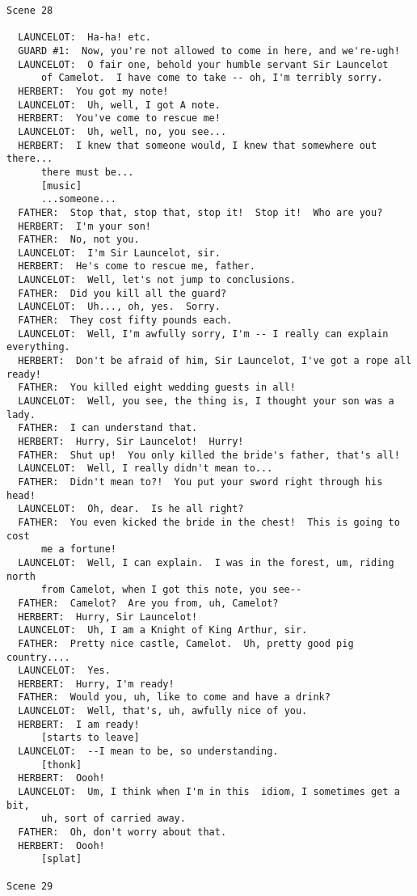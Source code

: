 \documentclass{article}
\begin{document}
\begin{verbatim}
Scene 28

  LAUNCELOT:  Ha-ha! etc.
  GUARD #1:  Now, you're not allowed to come in here, and we're-ugh!
  LAUNCELOT:  O fair one, behold your humble servant Sir Launcelot
      of Camelot.  I have come to take -- oh, I'm terribly sorry.
  HERBERT:  You got my note!
  LAUNCELOT:  Uh, well, I got A note.
  HERBERT:  You've come to rescue me!
  LAUNCELOT:  Uh, well, no, you see...
  HERBERT:  I knew that someone would, I knew that somewhere out there...
      there must be...
      [music]
      ...someone...
  FATHER:  Stop that, stop that, stop it!  Stop it!  Who are you?
  HERBERT:  I'm your son!
  FATHER:  No, not you.
  LAUNCELOT:  I'm Sir Launcelot, sir.
  HERBERT:  He's come to rescue me, father.
  LAUNCELOT:  Well, let's not jump to conclusions.
  FATHER:  Did you kill all the guard?
  LAUNCELOT:  Uh..., oh, yes.  Sorry.
  FATHER:  They cost fifty pounds each.
  LAUNCELOT:  Well, I'm awfully sorry, I'm -- I really can explain everything.
  HERBERT:  Don't be afraid of him, Sir Launcelot, I've got a rope all ready!
  FATHER:  You killed eight wedding guests in all!
  LAUNCELOT:  Well, you see, the thing is, I thought your son was a lady.
  FATHER:  I can understand that.
  HERBERT:  Hurry, Sir Launcelot!  Hurry!
  FATHER:  Shut up!  You only killed the bride's father, that's all!
  LAUNCELOT:  Well, I really didn't mean to...
  FATHER:  Didn't mean to?!  You put your sword right through his head!
  LAUNCELOT:  Oh, dear.  Is he all right?
  FATHER:  You even kicked the bride in the chest!  This is going to cost
      me a fortune!
  LAUNCELOT:  Well, I can explain.  I was in the forest, um, riding north
      from Camelot, when I got this note, you see--
  FATHER:  Camelot?  Are you from, uh, Camelot?
  HERBERT:  Hurry, Sir Launcelot!
  LAUNCELOT:  Uh, I am a Knight of King Arthur, sir.
  FATHER:  Pretty nice castle, Camelot.  Uh, pretty good pig country....
  LAUNCELOT:  Yes.
  HERBERT:  Hurry, I'm ready!
  FATHER:  Would you, uh, like to come and have a drink?
  LAUNCELOT:  Well, that's, uh, awfully nice of you.
  HERBERT:  I am ready!
      [starts to leave]
  LAUNCELOT:  --I mean to be, so understanding.
      [thonk]
  HERBERT:  Oooh!
  LAUNCELOT:  Um, I think when I'm in this  idiom, I sometimes get a bit,
      uh, sort of carried away.
  FATHER:  Oh, don't worry about that.
  HERBERT:  Oooh!
      [splat]

Scene 29


\end{verbatim}
\end{document}
